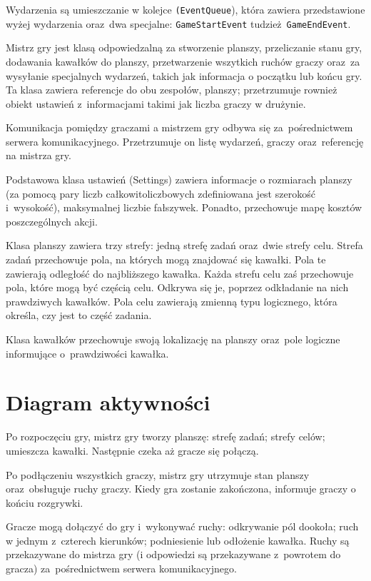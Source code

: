 \documentclass[a4paper]{article}
\newcommand{\code}{\texttt}
\begin{document}
Wydarzenia są umieszczanie w kolejce \code{(EventQueue}), która zawiera przedstawione wyżej wydarzenia oraz~dwa specjalne: \code{GameStartEvent} tudzież~\code{GameEndEvent}.

\hfill

Mistrz gry jest klasą odpowiedzalną za stworzenie planszy, przeliczanie stanu gry, dodawania kawałków do planszy, przetwarzenie wszytkich ruchów graczy oraz~za wysyłanie specjalnych wydarzeń, takich jak informacja o początku lub końcu gry.
Ta klasa zawiera referencje do obu zespołów, planszy; przetrzumuje rownież obiekt ustawień z~informacjami takimi jak liczba graczy w drużynie.

Komunikacja pomiędzy graczami a mistrzem gry odbywa się za~pośrednictwem serwera komunikacyjnego.
Przetrzumuje on listę wydarzeń, graczy oraz~referencję na mistrza gry.

Podstawowa klasa ustawień (Settings) zawiera informacje o rozmiarach planszy (za pomocą pary liczb całkowitoliczbowych zdefiniowana jest szerokość i~wysokość), maksymalnej liczbie fałszywek.
Ponadto, przechowuje mapę kosztów poszczególnych akcji.

Klasa planszy zawiera trzy strefy: jedną strefę zadań oraz~dwie strefy celu.
Strefa zadań przechowuje pola, na których mogą znajdować się kawałki.
Pola te zawierają odległość do najbliższego kawałka.
Każda strefu celu zaś przechowuje pola, które mogą być częścią celu.
Odkrywa się je, poprzez odkładanie na nich prawdziwych kawałków.
Pola celu zawierają zmienną typu logicznego, która określa, czy jest to część zadania.

Klasa kawałków przechowuje swoją lokalizację na planszy oraz~pole logiczne informujące o~prawdziwości kawałka.

\newpage
\section{Diagram aktywności}

Po rozpoczęciu gry, mistrz gry tworzy planszę: strefę zadań; strefy celów; umieszcza kawałki.
Następnie czeka aż gracze się połączą.

Po podłączeniu wszystkich graczy, mistrz gry utrzymuje stan planszy oraz~obsługuje ruchy graczy.
Kiedy gra zostanie zakończona, informuje graczy o końciu rozgrywki.

Gracze mogą dołączyć do gry i~wykonywać ruchy: odkrywanie pól dookoła; ruch w jednym z~czterech kierunków; podniesienie lub odłożenie kawałka.
Ruchy są przekazywane do mistrza gry (i odpowiedzi są przekazywane z~powrotem do gracza) za~pośrednictwem serwera komunikacyjnego.
\end{document}
